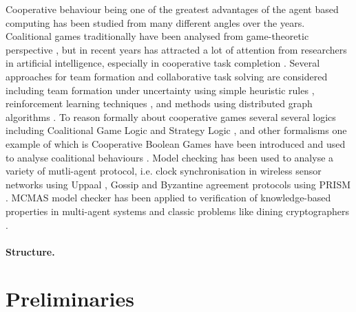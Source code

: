 \documentclass{llncs}
\begin{document}
Cooperative behaviour being one of the greatest advantages of the agent based computing has been studied from many different angles over the years. Coalitional games traditionally have been analysed from game-theoretic perspective \cite{osborne1994course}, but in recent years has attracted a lot of attention from researchers in artificial intelligence, especially in cooperative task completion \cite{shehory1998methods}. Several approaches for team formation and collaborative task solving are considered including team formation under uncertainty using simple heuristic rules \cite{kraus2003coalition}, reinforcement learning techniques \cite{abdallah2004organization}, and methods using distributed graph algorithms \cite{manisterski2006forming}. To reason formally about cooperative games several several logics  including Coalitional Game Logic \cite{agotnes2009reasoning} and Strategy Logic \cite{chatterjee2007strategy}, and other formalisms one example of which is Cooperative Boolean Games \cite{dunne2008cooperative} have been introduced and used to analyse coalitional behaviours \cite{bonzon2007efficient}. Model checking has been used to analyse a variety of mutli-agent protocol, i.e. clock synchronisation in wireless sensor networks using Uppaal \cite{heidarian2009analysis}, Gossip  \cite{KNP08d} and Byzantine agreement protocols  \cite{KN02} using PRISM   \cite{KNP11}. MCMAS model checker has been applied to verification of knowledge-based properties in multi-agent systems and classic problems like dining cryptographers \cite{lomuscio2006mcmas}.



\paragraph{Structure.}


\section{Preliminaries}


\end{document}
